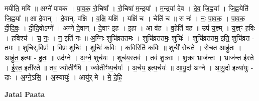 \documentclass[17pt]{extarticle}
\begin{document}
मयीति॒ मयि॑ ॥ अग्ने॑ पावक । पा॒व॒क॒ रो॒चिषा᳚ । रो॒चिषा॑ म॒न्द्रया᳚ । म॒न्द्रया॑ देव । दे॒व॒ जि॒ह्वया᳚ । जि॒ह्वयेति॑ जि॒ह्वया᳚ ॥ आ दे॒वान् । दे॒वान्. व॑क्षि । व॒क्षि॒ यक्षि॑ । यक्षि॑ च । चेति॑ च ॥ स नः॑ । नः॒ पा॒व॒क॒ । पा॒व॒क॒ दी॒दि॒वः॒ । दी॒दि॒वोऽग्ने᳚ । अग्ने॑ दे॒वान् । दे॒वाꣳ इ॒ह । इ॒हा । आ व॑ह । व॒हेति॑ वह ॥ उप॑ य॒ज्ञ्म् । य॒ज्ञ्ꣳ ह॒विः । ह॒विश्च॑ । च॒ नः॒ । न॒ इति॑ नः ॥ अ॒ग्निः शुचि॑व्रततमः । शुचि॑व्रततमः॒ शुचिः॑ । शुचि॑व्रततम॒ इति॒ शुचि॑व्रत - त॒मः॒ । शुचि॒र्,विप्रः॑ । विप्रः॒ शुचिः॑ । शुचिः॑ क॒विः । क॒विरिति॑ क॒विः ॥ शुची॑ रोचते । रो॒च॒त॒ आहु॑तः । आहु॑त॒ इत्या - हु॒तः॒ ॥ उद॑ग्ने । अ॒ग्ने॒ शुच॑यः । शुच॑य॒स्तव॑ । तव॑ शु॒क्राः । शु॒क्रा भ्राज॑न्तः । भ्राज॑न्त ईरते । ई॒र॒त॒ इती॑रते ॥ तव॒ ज्योतीꣳ॑षि । ज्योतीꣳ॑ष्य॒र्चयः॑ । अ॒र्चय॒ इत्य॒र्चयः॑ ॥ आ॒यु॒र्दा अ॑ग्ने । आ॒यु॒र्दा इत्या॑युः - दाः । अ॒ग्ने॒ऽसि॒ । अ॒स्यायुः॑ । आयु॑र् मे । मे॒ दे॒हि॒ \newline

\textbf{Jatai Paata} \newline
\end{document}
